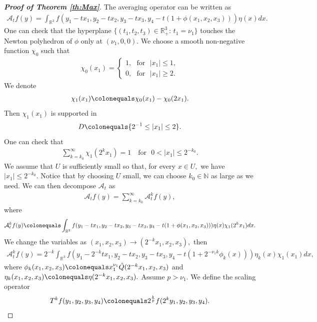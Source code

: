 \documentclass[a4paper, 11pt]{article}
\theoremstyle{plain}
\theoremstyle{definition}
\theoremstyle{lemma}
\theoremstyle{Remark}
\theoremstyle{proposition}
\theoremstyle{corollary}
\theoremstyle{example}
\theoremstyle{assumption}
\begin{document}
\begin{proof}[\textbf{Proof of Theorem \ref{th:Max}}]
The averaging operator can be written as
\begin{eqnarray*}
\mathcal{A}_tf(y)=
\int_{\mathbb{R}^3}f(y_1-tx_1,y_2-tx_2,y_3-tx_3, y_4-t(1+ \phi(x_1,x_2,x_3))) \eta(x)dx.
\end{eqnarray*}
 One can check that the hyperplane $\{(t_1, t_2, t_3)\in \mathbb{R}^3_{+}:\, t_1=\nu_1\}$  touches  the Newton polyhedron of $\phi$ only at $(\nu_1,0,0).$
We choose a smooth non-negative function $\chi_0$  such that
\begin{eqnarray*}
\chi_0(x_1)=\begin{cases}1,\,\,\,\,\text{for}\,\,\,\,|x_1|\leq 1,\\
0,\,\,\,\,\text{for}\,\,\,\,|x_1|\ge 2.\end{cases}
\end{eqnarray*}
We denote
\begin{eqnarray*}
\chi_1(x_1)\colonequals \chi_0(x_1)-\chi_0(2x_1).
\end{eqnarray*}
Then $\chi_1(x_1)$ is supported in
$$D\colonequals \{2^{-1}\leq  |x_1|\leq 2\}.$$
One can check that
\begin{eqnarray*}
\sum_{k=k_0}^{\infty}\chi_1(2^kx_1)=1\,\,\,\,\,\,\text{for}\,\,\,\,0<|x_1|\leq 2^{-k_0}.
\end{eqnarray*}
We assume that $U$ is sufficiently small so that, for every $x\in U,$ we have $|x_1|\leq 2^{-k_0}.$ Notice that by choosing $U$ small, we can choose $k_0\in \mathbb{N}$ as large as we need. We can then decompose $\mathcal{A}_t$  as
\begin{eqnarray*}
\mathcal{A}_tf(y)=\sum_{k=k_0}^{\infty} \mathcal{A}_t^k f(y),
\end{eqnarray*}
where
\begin{eqnarray*}
 \mathcal{A}_t^k f(y)\colonequals \int_{\mathbb{R}^3}f(y_1-tx_1,y_2-tx_2,y_3-tx_3, y_4-t(1+ \phi(x_1,x_2,x_3))) \eta(x)\chi_1(2^kx_1)dx.
 \end{eqnarray*}
 We change the variables as $(x_1, x_2, x_3)\to (2^{-k}x_1, x_2, x_3),$ then
\begin{eqnarray*}
\mathcal{A}_t^kf(y)=
2^{-k}\int_{\mathbb{R}^3}f(y_1-2^{-k}tx_1, y_2-tx_2, y_3-tx_3, y_4-t(1+ 2^{-\nu_1k}\phi_k(x))) \eta_k(x)\chi_1(x_1)dx,
\end{eqnarray*}
where $\phi_k(x_1, x_2, x_3)\colonequals  x_1^{\nu_1} \tilde Q(2^{-k}x_1, x_2, x_3)$ and $\eta_k(x_1, x_2, x_3)\colonequals \eta(2^{-k}x_1, x_2, x_3). $ Assume $p>\nu_1.$ We define the scaling operator
\begin{eqnarray*}
T^kf(y_1,y_2,y_3,y_4)\colonequals 2^{\frac{k}{ p}} f(2^ky_1,  y_2,  y_3, y_4).

\end{eqnarray*}
\end{proof}
\end{document}

